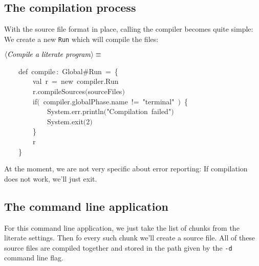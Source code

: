 \documentclass[a4paper,12pt]{article}
\begin{document}
\subsection{The compilation process}
With the source file format in place, calling the compiler becomes quite
simple: We create a new \texttt{Run} which will compile the files:

$\left<\mbox{\emph{Compile a literate program}}\right>\equiv$
\begin{program}~~~~{\vem def}~compile\,{\rm :}~Global\#Run~=~{\small\{}
\\~~~~~~~~{\vem val}~r~=~{\vem new}~compiler.Run
\\[0.5em]~~~~~~~~r.compileSources$($sourceFiles$)$
\\~~~~~~~~{\vem if}$($~compiler.globalPhase.name~!=~"terminal"~$)$~{\small\{}
\\~~~~~~~~~~~~System.err.println$($"Compilation~failed"$)$
\\~~~~~~~~~~~~System.exit$($2$)$
\\~~~~~~~~{\small\}}
\\[0.5em]~~~~~~~~r
\\~~~~{\small\}}
\\[0.5em]\end{program}



At the moment, we are not very specific about error reporting: If
compilation does not work, we'll just exit.

\subsection{The command line application}
For this command line application, we just take the list of
chunks from the literate settings. Then fo every such chunk
we'll create a source file. All of these source files are
compiled together and stored in the path given by the \texttt{-d}
command line flag.
\end{document}
